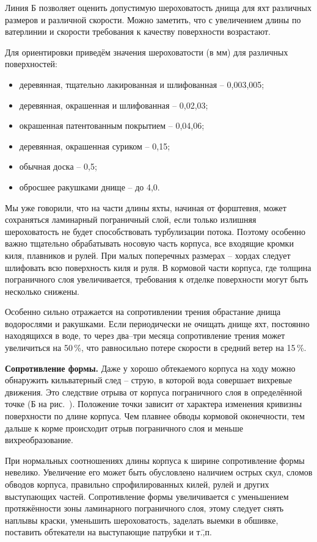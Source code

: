 Линия Б позволяет оценить допустимую шероховатость днища для яхт
различных размеров и различной скорости. Можно заметить, что с
увеличением длины по ватерлинии и скорости требования к качеству
поверхности возрастают.

Для ориентировки приведём значения шероховатости (в мм) для различных поверхностей:
\begin{itemize}
\item деревянная, тщательно лакированная и шлифованная \--- 0,003,005; 
\item деревянная, окрашенная и шлифованная \--- 0,02,03; 
\item окрашенная патентованным покрытием \--- 0,04,06; 
\item деревянная, окрашенная суриком \--- 0,15; 
\item обычная доска \--- 0,5; 
\item обросшее ракушками днище \--- до 4,0.
\end{itemize}

Мы уже говорили, что на части длины яхты, начиная от форштевня, может
сохраняться ламинарный пограничный слой, если только излишняя
шероховатость не будет способствовать турбулизации потока. Поэтому
особенно важно тщательно обрабатывать носовую часть корпуса, все
входящие кромки киля, плавников и рулей. При малых поперечных размерах
\--- хордах следует шлифовать всю поверхность киля и руля. В кормовой
части корпуса, где толщина пограничного слоя увеличивается, требования
к отделке поверхности могут быть несколько снижены.

Особенно сильно отражается на сопротивлении трения обрастание днища
водорослями и ракушками. Если периодически не очищать днище яхт,
постоянно находящихся в воде, то через два--три месяца сопротивление
трения может увеличиться на 50\,\%, что равносильно потере
скорости в средний ветер на 15\,\%.

\textbf{Сопротивление формы.} Даже у хорошо
обтекаемого корпуса на ходу можно обнаружить кильватерный след \---
струю, в которой вода совершает вихревые движения. Это следствие
отрыва от корпуса пограничного слоя в определённой точке (Б на
рис.~). Положение точки зависит от характера изменения
кривизны поверхности по длине корпуса. Чем плавнее обводы кормовой
оконечности, тем дальше к корме происходит отрыв пограничного слоя и
меньше вихреобразование.

При нормальных соотношениях длины корпуса к ширине сопротивление формы
невелико. Увеличение его может быть обусловлено наличием острых скул,
сломов обводов корпуса, правильно спрофилированных килей, рулей и
других выступающих частей. Сопротивление формы увеличивается с
уменьшением протяжённости зоны ламинарного пограничного слоя, этому
следует снять наплывы краски, уменьшить шероховатость, заделать выемки
в обшивке, поставить обтекатели на выступающие патрубки и т.\=,п.

